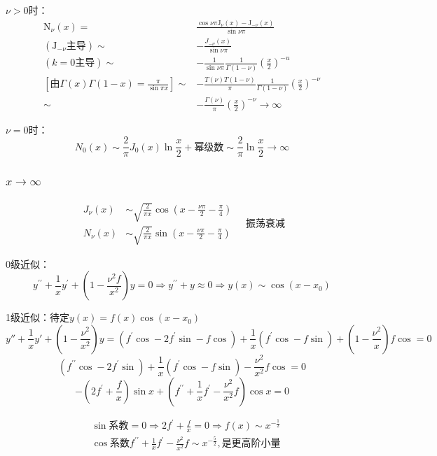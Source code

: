 $\nu>0$时：
$$\begin{aligned}
\mathrm{N}_\nu(x)=&\frac{\cos\nu\pi\mathrm{J}_\nu(x)-\mathrm{J}_{-\nu}(x)}{\sin\nu\pi}\\
(\mathrm{J}_{-\nu}\mbox{主导})\sim& -\frac{J_{-\nu}(x)}{\sin \nu\pi}\\
(k=0\mbox{主导})\sim& -\frac{1}{\sin \nu\pi}\frac{1}{\Gamma(1-\nu)}(\frac{x}{2})^{-u}\\
\left[\mbox{由}\Gamma(x)\Gamma(1-x)=\frac{\pi}{\sin\pi x}\right]\sim&-\frac{T(\nu)T(1-\nu)}{\pi}\frac{1}{\Gamma(1-\nu)}\left(\frac{x}{2}\right)^{-\nu}\\
\sim&-\frac{\Gamma(\nu)}{\pi}\left(\frac{x}{2}\right)^{-\nu}\rightarrow\infty
\end{aligned}$$

$\nu=0$时：
$$N_{0}(x)\sim\frac{2}{\pi}J_{0}(x)\ln\frac{x}{2}+\text{幂级数}\sim\frac{2}{\pi}\ln\frac{x}{2}\rightarrow\infty$$


\subsubsection{$x\rightarrow\infty$}
$$\begin{aligned}
    J_{\nu}(x)&\sim\sqrt{\frac{2}{\pi x}}\cos(x-\frac{\nu\pi}{2}-\frac{\pi}{4})\\
    N_{\nu}(x)&\sim\sqrt{\frac{2}{\pi x}}\sin(x-\frac{\nu\pi}{2}-\frac{\pi}{4})\end{aligned} \quad\text{振荡衰减}
$$

\noindent 0级近似：
$$y^{\prime\prime}+\frac{1}{x}y^{\prime}+(1-\frac{\nu^{2}f}{x^{2}})y=0\Rightarrow y^{\prime\prime}+y\approx0\Rightarrow y(x)\sim\cos(x-x_0)$$

\noindent 1级近似：待定$y(x)=f(x)\cos(x-x_0)$
$$y''+\frac{1}{x}y'+(1-\frac{\nu^2}{x^2})y=(f^{\prime}\cos-2f^{\prime}\sin-f\cos)+\frac{1}{x}(f^{\prime}\cos-f\sin)+(1-\frac{\nu^{2}}{x})f\cos=0$$
$$(f^{\prime\prime}\cos-2f^{\prime}\sin)+\frac{1}{x}(f^{\prime}\cos-f\sin)-\frac{\nu^{2}}{x^{2}}f\cos=0$$
$$-(2f^{\prime}+\frac{f}{x})\sin x+(f^{\prime\prime}+\frac{1}{x}f^{\prime}-\frac{\nu^{2}}{x^{2}}f)\cos x=0$$

$$\begin{aligned}
&\sin\text{系教}=0\Rightarrow 2f^{\prime}+\frac{f}{x}=0\Rightarrow f(x)\sim x^{-\frac{1}{2}}\\
&\cos\text{系数}f^{\prime\prime}+\frac{1}{x}f^{\prime}-\frac{\nu^{2}}{x^{2}}f\sim x^{-\frac{5}{2}},\text{是更高阶小量}
\end{aligned}$$

